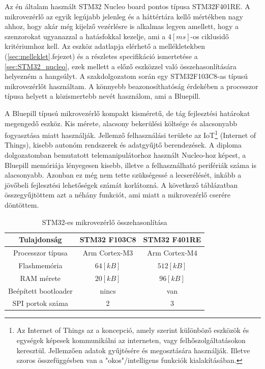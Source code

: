 Az én általam használt STM32 Nucleo board pontos típusa STM32F401RE. A mikrovezérlő az egyik legújabb jelenleg és a háttértára kellő mértékben nagy ahhoz, hogy akár még kijelző vezérlésre is alkalmas legyen amellett, hogy a szenzorokat ugyanazzal a hatásfokkal kezelje, ami a $4[ms]$-os ciklusidő kritériumhoz kell. Az eszköz adatlapja elérhető a mellékletekben (\ref{sec:melleklet}.fejezet) és a részletes specifikáció ismertetése a \ref{sec:STM32_nucleo}, ezek mellett a előző eszközzel való összehasonlítására helyezném a hangsúlyt. A szakdolgozatom során egy STM32F103C8-as típusú mikrovezérlőt használtam. A könnyebb beazonosíthatóság érdekében a processzor típusa helyett a közismertebb nevét használom, ami a Bluepill.

A Bluepill típusú mikrovezérlő kompakt kisméretű, de tág fejlesztési határokat megengedő eszköz. Kis mérete, alacsony bekerülési költsége és alacsonyabb fogyasztása miatt használják. Jellemző felhasználási területe az IoT\footnote{Az Internet of Things az a koncepció, amely szerint különböző eszközök és egységek képesek kommunikálni az interneten, vagy felhőszolgáltatásokon keresztül. Jellemzően adatok gyűjtésére és megosztására használják. Illetve szoros összefüggésben van a "okos"/intelligens funkciók kialakításában.} (Internet of Things), kisebb autonóm rendszerek és adatgyűjtő berendezések. A diploma dolgozatomban bemutatott telemanipulátorhoz használt Nucleo-hoz képest, a Bluepill memóriája lényegesen kisebb, illetve a felhasználható perifériák száma is alacsonyabb. Azonban ez még nem tette szükségessé a lecserélését, inkább a jövőbeli fejlesztési lehetőségek számát korlátozná. A következő táblázatban összegyűjtöttem azt a néhány funkciót, ami miatt a mikrovezérlő cserére döntöttem.

\begin{table}[!h]
\begin{center}
    \begin{tabular}{|c c c|} 
        \hline
        Tulajdonság & STM32 F103C8 & STM32 F401RE  \\ 
        \hline
        Processzor típusa     &  Arm Cortex-M3  &  Arm Cortex-M4  \\
        Flashmemória          & $64[kB]$        & $512[kB]$       \\
        RAM mérete            & $20[kB]$    	& $96[kB]$        \\
        Beépített bootloader  & nincs           & van             \\
        SPI portok száma      & 2               & 3               \\
        \hline
    \end{tabular}
    \caption{STM32-es mikrovezérlő összehasonlítása}
\end{center}
\end{table}


